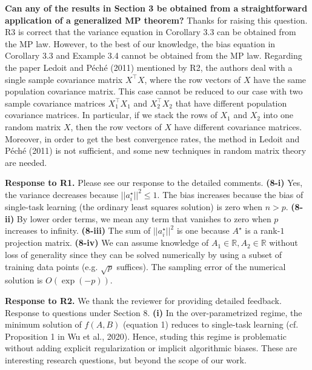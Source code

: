 \documentclass{article}
\begin{document}
	\textbf{Can any of the results in Section 3 be obtained from a straightforward application of a generalized MP theorem?}
	Thanks for raising this question. R3 is correct that the variance equation in Corollary 3.3 can be obtained from the MP law.
	However, to the best of our knowledge, the bias equation in Corollary 3.3 and Example 3.4 cannot be obtained from the MP law.
	Regarding the paper Ledoit and P{\'e}ch{\'e} (2011) mentioned by R2, the authors deal with a single sample covariance matrix $X^\top X$, where the row vectors of $X$ have the same population covariance matrix. This case cannot be reduced to our case with two sample covariance matrices $X_1^\top X_1$ and $X_2^\top X_2$ that have different population covariance matrices. In particular, if we stack the rows of $X_1$ and $X_2$ into one random matrix $X$, then the row vectors of $X$ have different covariance matrices. Moreover, in order to get the best convergence rates, the method in  Ledoit and P{\'e}ch{\'e} (2011) is not sufficient, and some new techniques in random matrix theory are needed. 

	\textbf{Response to R1.} Please see our response to the detailed comments.
	\textbf{(8-i)} Yes, the variance decreases because $||{a_i^{\star}}||^2 \le 1$.
	The bias increases because the bias of single-task learning (the ordinary least squares solution) is zero when $n > p$.
	\textbf{(8-ii)} By lower order terms, we mean any term that vanishes to zero when $p$ increases to infinity.
	\textbf{(8-iii)} The sum of $||{a_i^{\star}}||^2$ is one because $A^{\star}$ is a rank-$1$ projection matrix.
	\textbf{(8-iv)} %
	We can assume knowledge of $A_1 \in \mathbb R, A_2 \in \mathbb R$ without loss of generality since they can be solved numerically by using a subset of training data points (e.g. $\sqrt{p}$ suffices).
	The sampling error of the numerical solution is $O(\exp(-p))$.

	\textbf{Response to R2.} We thank the reviewer for providing detailed feedback.
	Response to questions under Section 8.
	\textbf{(i)}
	In the over-parametrized regime, the minimum solution of $f(A ,B)$ (equation 1) reduces to single-task learning  (cf. Proposition 1 in Wu et al., 2020).
	Hence, studing this regime is problematic without adding explicit regularization or implicit algorithmic biases.
	These are interesting research questions, but beyond the scope of our work.
\end{document}
